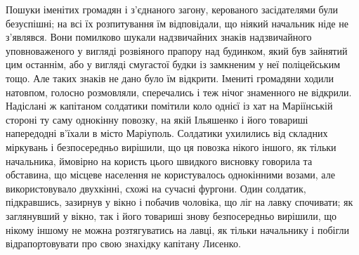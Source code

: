 \documentclass[a4paper,20pt]{report}
\begin{document}
Пошуки іменітих громадян і з'єднаного загону, керованого засідателями були
безуспішні; на всі їх розпитування їм відповідали, що ніякий начальник ніде не
з'являвся. Вони помилково шукали надзвичайних знаків надзвичайного
уповноваженого у вигляді розвіяного прапору над будинком, який був зайнятий цим
останнім, або у вигляді смугастої будки із замкненим у неї поліцейським тощо.
Але таких знаків не дано було їм відкрити. Імениті громадяни ходили натовпом,
голосно розмовляли, сперечались і теж нічог знаменного не відкрили. Надіслані ж
капітаном солдатики помітили коло однієї із хат на Маріїнській стороні ту саму
однокінну повозку, на
якій Ільяшенко і його товариші напередодні в'їхали в місто Маріуполь. Солдатики
ухилились від складних міркувань і безпосередньо вирішили, що ця повозка нікого
іншого, як тільки начальника, ймовірно на користь цього швидкого висновку
говорила та обставина, що місцеве населення не користувалось однокінними
возами, але використовувало двухкінні, схожі на сучасні фургони. Один солдатик,
підкравшись, зазирнув у вікно і побачив чоловіка, що ліг на лавку спочивати; як
заглянувший у вікно, так і його товариші знову безпосередньо вирішили, що
нікому іншому не можна розтягуватись на лавці, як тільки начальнику і побігли
відрапортовувати про свою знахідку капітану Лисенко.
\end{document}
